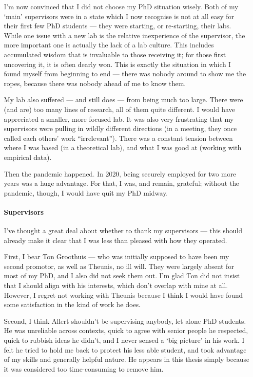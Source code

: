 I'm now convinced that I did not choose my PhD situation wisely.
Both of my `main' supervisors were in a state which I now recognise is not at all easy for their first few PhD students --- they were starting, or re-starting, their labs.
While one issue with a new lab is the relative inexperience of the supervisor, the more important one is actually the lack of a lab culture.
This includes accumulated wisdom that is invaluable to those receiving it; for those first uncovering it, it is often dearly won.
This is exactly the situation in which I found myself from beginning to end --- there was nobody around to show me the ropes, because there was nobody ahead of me to know them.

My lab also suffered --- and still does --- from being much too large. 
There were (and are) too many lines of research, all of them quite different.
I would have appreciated a smaller, more focused lab.
It was also very frustrating that my supervisors were pulling in wildly different directions (in a meeting, they once called each others' work ``irrelevant'').
There was a constant tension between where I was based (in a theoretical lab), and what I was good at (working with empirical data).

Then the pandemic happened.
In 2020, being securely employed for two more years was a huge advantage.
For that, I was, and remain, grateful; without the pandemic, though, I would have quit my PhD midway.

\paragraph*{Supervisors}

I've thought a great deal about whether to thank my supervisors --- this should already make it clear that I was less than pleased with how they operated.

First, I bear Ton Groothuis --- who was initially supposed to have been my second promotor, as well as Theunis, no ill will.
They were largely absent for most of my PhD, and I also did not seek them out.
I'm glad Ton did not insist that I should align with his interests, which don't overlap with mine at all.
However, I regret not working with Theunis because I think I would have found some satisfaction in the kind of work he does.

Second, I think Allert shouldn't be supervising anybody, let alone PhD students.
He was unreliable across contexts, quick to agree with senior people he respected, quick to rubbish ideas he didn't, and I never sensed a `big picture' in his work.
I felt he tried to hold me back to protect his less able student, and took advantage of my skills and generally helpful nature.
He appears in this thesis simply because it was considered too time-consuming to remove him.

